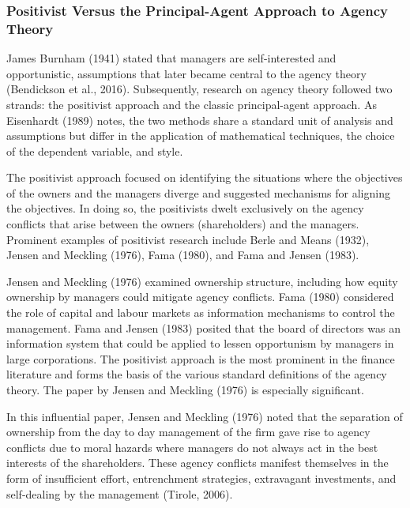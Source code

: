 \documentclass[a4paper, nobind]{templates/ociamthesis}
\begin{document}
\hypertarget{positivist-versus-the-principal-agent-approach-to-agency-theory}{%
\subsubsection{Positivist Versus the Principal-Agent Approach to Agency Theory}\label{positivist-versus-the-principal-agent-approach-to-agency-theory}}

James Burnham (1941) stated that managers are self-interested and opportunistic, assumptions that later became central to the agency theory (Bendickson et al., 2016). Subsequently, research on agency theory followed two strands: the positivist approach and the classic principal-agent approach. As Eisenhardt (1989) notes, the two methods share a standard unit of analysis and assumptions but differ in the application of mathematical techniques, the choice of the dependent variable, and style.

The positivist approach focused on identifying the situations where the objectives of the owners and the managers diverge and suggested mechanisms for aligning the objectives. In doing so, the positivists dwelt exclusively on the agency conflicts that arise between the owners (shareholders) and the managers. Prominent examples of positivist research include Berle and Means (1932), Jensen and Meckling (1976), Fama (1980), and Fama and Jensen (1983).

Jensen and Meckling (1976) examined ownership structure, including how equity ownership by managers could mitigate agency conflicts. Fama (1980) considered the role of capital and labour markets as information mechanisms to control the management. Fama and Jensen (1983) posited that the board of directors was an information system that could be applied to lessen opportunism by managers in large corporations. The positivist approach is the most prominent in the finance literature and forms the basis of the various standard definitions of the agency theory. The paper by Jensen and Meckling (1976) is especially significant.

In this influential paper, Jensen and Meckling (1976) noted that the separation of ownership from the day to day management of the firm gave rise to agency conflicts due to moral hazards where managers do not always act in the best interests of the shareholders. These agency conflicts manifest themselves in the form of insufficient effort, entrenchment strategies, extravagant investments, and self-dealing by the management (Tirole, 2006).
\end{document}
